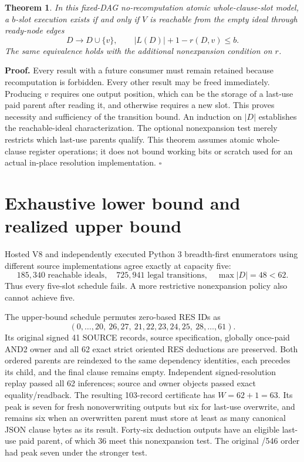 \documentclass[11pt]{article}
\newtheorem{theorem}{Theorem}
\begin{document}
\begin{theorem}
In this fixed-DAG no-recomputation atomic whole-clause-slot model, a \(b\)-slot execution exists if and only if \(V\) is reachable from the empty ideal through ready-node edges
\[
D\longrightarrow D\cup\{v\},\qquad |L(D)|+1-r(D,v)\leq b.
\]
The same equivalence holds with the additional nonexpansion condition on \(r\).
\end{theorem}
\textbf{Proof.} Every result with a future consumer must remain retained because recomputation is forbidden. Every other result may be freed immediately. Producing \(v\) requires one output position, which can be the storage of a last-use paid parent after reading it, and otherwise requires a new slot. This proves necessity and sufficiency of the transition bound. An induction on \(|D|\) establishes the reachable-ideal characterization. The optional nonexpansion test merely restricts which last-use parents qualify. This theorem assumes atomic whole-clause register operations; it does not bound working bits or scratch used for an actual in-place resolution implementation. \(\square\)

\section*{Exhaustive lower bound and realized upper bound}
Hosted V8 and independently executed Python 3 breadth-first enumerators using different source implementations agree exactly at capacity five:
\[
\boxed{185{,}340\text{ reachable ideals},\quad725{,}941
\text{ legal transitions},\quad\max |D|=48<62.}
\]
Thus every five-slot schedule fails. A more restrictive nonexpansion policy also cannot achieve five.

The upper-bound schedule permutes zero-based RES IDs as
\[
(0,\ldots,20,\ 26,27,\ 21,22,23,24,25,\ 28,\ldots,61).
\]
Its original signed 41 SOURCE records, source specification, globally once-paid AND2 owner and all 62 exact strict oriented RES deductions are preserved. Both ordered parents are reindexed to the same dependency identities, each precedes its child, and the final clause remains empty. Independent signed-resolution replay passed all 62 inferences; source and owner objects passed exact equality/readback. The resulting 103-record certificate has \(W=62+1=63\). Its peak is seven for fresh nonoverwriting outputs but six for last-use overwrite, and remains six when an overwritten parent must store at least as many canonical JSON clause bytes as its result. Forty-six deduction outputs have an eligible last-use paid parent, of which 36 meet this nonexpansion test. The original /546 order had peak seven under the stronger test.
\end{document}
